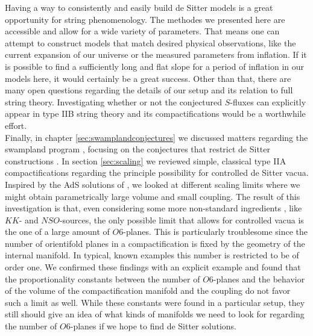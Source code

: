\documentclass[a4paper,12pt]{report}
\begin{document}
Having a way to consistently and easily build de Sitter models is a great opportunity for string phenomenology. The methodes we presented here are accessible and allow for a wide variety of parameters. That means one can attempt to construct models that match desired physical observations, like the current expansion of our universe or the measured parameters from inflation. If it is possible to find a sufficiently long  and flat slope for a period of inflation in our models here, it would certainly be a great success. Other than that, there are many open questions regarding the details of our setup and its relation to full string theory. Investigating whether or not the conjectured $S$-fluxes can explicitly appear in type IIB string theory and its compactifications would be a worthwhile effort.\\
Finally, in chapter \ref{sec:swamplandconjectures} we discussed matters regarding the swampland program \cite{Brennan:2017rbf,Palti:2019pca,vanBeest:2021lhn}, focusing on the conjectures that restrict de Sitter constructions \cite{Danielsson:2018ztv,Obied:2018sgi,Ooguri:2018wrx,Andriot:2018mav}. In section \ref{sec:scaling} we reviewed simple, classical type IIA compactifications regarding the principle possibility for controlled de Sitter vacua. Inspired by the AdS solutions of \cite{DeWolfe:2005uu}, we looked at different scaling limits where we might obtain parametrically large volume and small coupling. The result of this investigation is that, even considering some more non-standard ingredients \cite{Caviezel:2008tf,Flauger:2008ad,Saltman:2004jh,Silverstein:2007ac,Haque:2008jz,Danielsson:2009ff,deCarlos:2009fq,deCarlos:2009qm,Caviezel:2009tu,Danielsson:2010bc,Dong:2010pm,Andriot:2010ju}, like $KK$- and $NSO$-sources, the only possible limit that allows for controlled vacua is the one of a large amount of $O6$-planes. This is particularly troublesome since the number of orientifold planes in a compactification is fixed by the geometry of the internal manifold. In typical, known examples this number is restricted to be of order one. We confirmed these findings with an explicit example and found that the proportionality constants between the number of $O6$-planes and the behavior of the volume of the compactification manifold and the coupling do not favor such a limit as well. While these constants were found in a particular setup, they still should give an idea of what kinds of manifolds we need to look for regarding the number of $O6$-planes if we hope to find de Sitter solutions.\\
\end{document}
